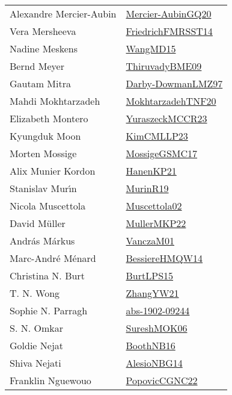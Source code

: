 {\begin{longtable}{p{4cm}p{20cm}}
Alexandre Mercier{-}Aubin & \href{papers/Mercier-AubinGQ20.pdf}{Mercier-AubinGQ20}\cite{Mercier-AubinGQ20} \\
Vera Mersheeva & \href{}{FriedrichFMRSST14}\cite{FriedrichFMRSST14} \\
Nadine Meskens & \href{articles/WangMD15.pdf}{WangMD15}\cite{WangMD15} \\
Bernd Meyer & \href{papers/ThiruvadyBME09.pdf}{ThiruvadyBME09}\cite{ThiruvadyBME09} \\
Gautam Mitra & \href{articles/Darby-DowmanLMZ97.pdf}{Darby-DowmanLMZ97}\cite{Darby-DowmanLMZ97} \\
Mahdi Mokhtarzadeh & \href{}{MokhtarzadehTNF20}\cite{MokhtarzadehTNF20} \\
Elizabeth Montero & \href{articles/YuraszeckMCCR23.pdf}{YuraszeckMCCR23}\cite{YuraszeckMCCR23} \\
Kyungduk Moon & \href{papers/KimCMLLP23.pdf}{KimCMLLP23}\cite{KimCMLLP23} \\
Morten Mossige & \href{papers/MossigeGSMC17.pdf}{MossigeGSMC17}\cite{MossigeGSMC17} \\
Alix Munier Kordon & \href{papers/HanenKP21.pdf}{HanenKP21}\cite{HanenKP21} \\
Stanislav Mur{\'{\i}}n & \href{papers/MurinR19.pdf}{MurinR19}\cite{MurinR19} \\
Nicola Muscettola & \href{papers/Muscettola02.pdf}{Muscettola02}\cite{Muscettola02} \\
David M{\"{u}}ller & \href{articles/MullerMKP22.pdf}{MullerMKP22}\cite{MullerMKP22} \\
Andr{\'{a}}s M{\'{a}}rkus & \href{papers/VanczaM01.pdf}{VanczaM01}\cite{VanczaM01} \\
Marc{-}Andr{\'{e}} M{\'{e}}nard & \href{papers/BessiereHMQW14.pdf}{BessiereHMQW14}\cite{BessiereHMQW14} \\
Christina N. Burt & \href{papers/BurtLPS15.pdf}{BurtLPS15}\cite{BurtLPS15} \\
T. N. Wong & \href{articles/ZhangYW21.pdf}{ZhangYW21}\cite{ZhangYW21} \\
Sophie N. Parragh & \href{articles/abs-1902-09244.pdf}{abs-1902-09244}\cite{abs-1902-09244} \\
S. N. Omkar & \href{}{SureshMOK06}\cite{SureshMOK06} \\
Goldie Nejat & \href{papers/BoothNB16.pdf}{BoothNB16}\cite{BoothNB16} \\
Shiva Nejati & \href{papers/AlesioNBG14.pdf}{AlesioNBG14}\cite{AlesioNBG14} \\
Franklin Nguewouo & \href{papers/PopovicCGNC22.pdf}{PopovicCGNC22}\cite{PopovicCGNC22} \\

\end{longtable}}
